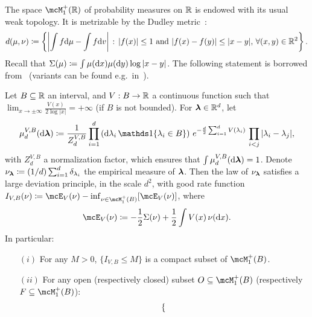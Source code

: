 \myskip
The space $\mcM_1^+(\bbR)$ of probability measures on $\mathbb{R}$ is endowed with its usual weak topology. 
It is metrizable by the Dudley metric~\citep{bogachev2007measure}:
\begin{equation}
    \label{eq:dudley}
    d(\mu, \nu) \coloneqq \left\{\left|\int f \mathrm{d} \mu - \int f \mathrm{d} v\right| \, : \, |f(x)| \leq 1 \textrm{ and } |f(x) - f(y)| \leq |x - y|, \, \forall (x, y) \in \mathbb{R}^2\right\}.
\end{equation}
Recall that $\Sigma(\mu) \coloneqq \int \mu(\mathrm{d} x) \mu(\mathrm{d} y) \log |x-y|$.
The following statement is borrowed from~\cite{fan2015convergence} (variants can be found e.g.\ in~\cite{arous1997large,anderson2010introduction}).
\begin{proposition}
    \label{prop:ldp_empirical_measure_conditioned}
    Let $B \subseteq \mathbb{R}$ an interval, and $V : B \to \mathbb{R}$ a continuous function such that $\lim_{x \to \pm \infty} \frac{V(x)}{2 \log |x|} = +\infty$ (if $B$ is not bounded).
    For ${\boldsymbol{\lambda}} \in \mathbb{R}^d$, let
    \begin{align}\label{eq:coulomb_gas_constraint}
        \mu_{d}^{V,B}(\rd \blambda) \coloneqq \frac{1}{Z_{d}^{V,B}} \prod_{i=1}^d \left(\rd \lambda_i \, \indi\{\lambda_i \in B\} \right) \, e^{-\frac{d}{2} \sum_{i=1}^d V(\lambda_i)} \, \prod_{i < j} |\lambda_i - \lambda_j|,
    \end{align}
    with $Z_d^{V,B}$ a normalization factor, which ensures that $\int \mu_d^{V, B}(\mathrm{d} {\boldsymbol{\lambda}}) = 1$.
    Denote $\nu_{\boldsymbol{\lambda}} \coloneqq (1/d) \sum_{i=1}^d \delta_{\lambda_i}$ the empirical measure of ${\boldsymbol{\lambda}}$.
    Then the law of $\nu_{\boldsymbol{\lambda}}$ satisfies a large deviation principle, in the scale $d^2$, with good rate function $I_{V,B}(\nu) \coloneqq \mcE_V(\nu) - \inf_{\nu \in \mcM_1^+(B)}[\mcE_V(\nu)]$, where 
    \begin{align}\label{eq:E_V}
        \mcE_V(\nu) \coloneqq - \frac{1}{2} \Sigma(\nu) + \frac{1}{2} \int V(x) \, \nu(\rd x).
    \end{align}
    In particular: 
    \begin{itemize}
        \item[$(i)$] For any $M > 0$, $\{I_{V, B} \leq M\}$ is a compact subset of $\mcM_1^+(B)$.
        \item[$(ii)$]  
        For any open (respectively closed) subset $O \subseteq \mcM_1^+(B)$ (respectively $F \subseteq \mcM_1^+(B)$): 
        \begin{equation*}
            \begin{dcases}

\end{dcases}
\end{equation*}
\end{itemize}
\end{proposition}
